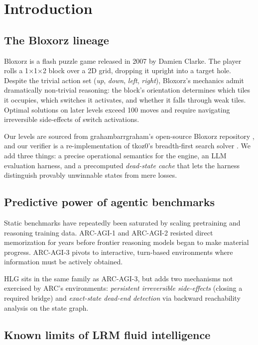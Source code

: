 \section{Introduction}
\label{sec:intro}

\subsection{The Bloxorz lineage}
\label{sec:lineage}

Bloxorz is a flash puzzle game released in 2007 by Damien Clarke. The player rolls a
1$\times$1$\times$2 block over a 2D grid, dropping it upright into a target hole. Despite
the trivial action set (\emph{up}, \emph{down}, \emph{left}, \emph{right}), Bloxorz's
mechanics admit dramatically non-trivial reasoning: the block's orientation determines
which tiles it occupies, which switches it activates, and whether it falls through weak
tiles. Optimal solutions on later levels exceed 100 moves and require navigating
irreversible side-effects of switch activations.

Our levels are sourced from grahambarrgraham's open-source Bloxorz repository
\cite{grahambarrgrahambloxorz}, and our verifier is a re-implementation of tkoz0's
breadth-first search solver \cite{tkoz0bloxorzsolver}. We add three things: a precise
operational semantics for the engine, an LLM evaluation harness, and a precomputed
\emph{dead-state cache} that lets the harness distinguish provably unwinnable states from
mere losses.

\subsection{Predictive power of agentic benchmarks}
\label{sec:predictive}

Static benchmarks have repeatedly been saturated by scaling pretraining and reasoning
training data. ARC-AGI-1 \cite{arcagi1onmeasure} and ARC-AGI-2 \cite{arcagi2} resisted
direct memorization for years before frontier reasoning models began to make material
progress. ARC-AGI-3 \cite{arcagi3} pivots to interactive, turn-based environments where
information must be actively obtained.

HLG sits in the same family as ARC-AGI-3, but adds two mechanisms not exercised by ARC's
environments: \emph{persistent irreversible side-effects} (closing a required bridge) and
\emph{exact-state dead-end detection} via backward reachability analysis on the
state graph.

\subsection{Known limits of LRM fluid intelligence}
\label{sec:limits}

